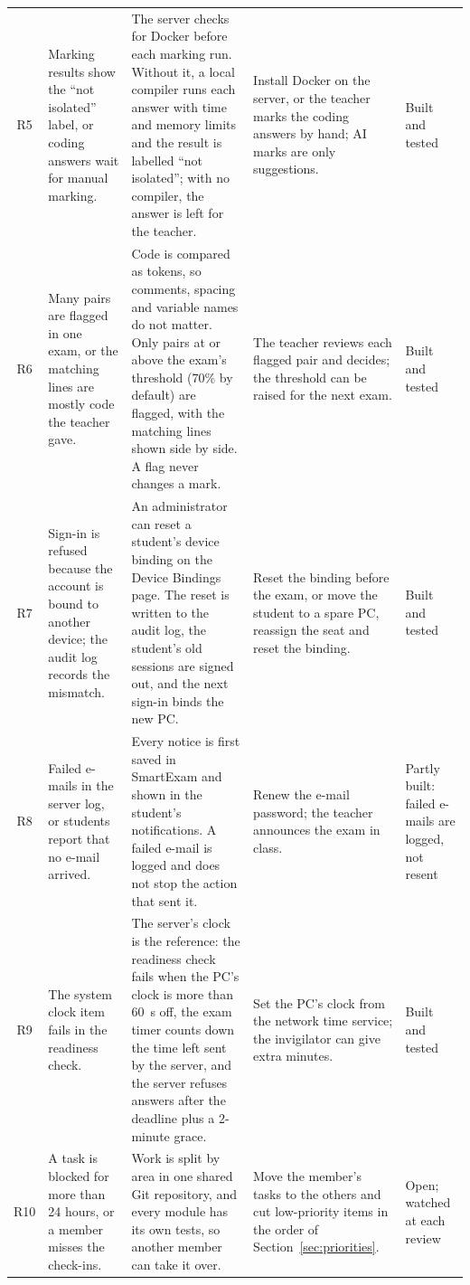 {\begin{longtable}{@{}c>{\raggedright\arraybackslash}p{2.9cm}>{\raggedright\arraybackslash}p{5.2cm}>{\raggedright\arraybackslash}p{3.9cm}>{\raggedright\arraybackslash}p{1.8cm}@{}}
R5 & Marking results show the ``not isolated'' label, or coding answers wait for manual marking. & The server checks for Docker before each marking run. Without it, a local compiler runs each answer with time and memory limits and the result is labelled ``not isolated''; with no compiler, the answer is left for the teacher. & Install Docker on the server, or the teacher marks the coding answers by hand; AI marks are only suggestions. & Built and tested \\
R6 & Many pairs are flagged in one exam, or the matching lines are mostly code the teacher gave. & Code is compared as tokens, so comments, spacing and variable names do not matter. Only pairs at or above the exam's threshold (70\% by default) are flagged, with the matching lines shown side by side. A flag never changes a mark. & The teacher reviews each flagged pair and decides; the threshold can be raised for the next exam. & Built and tested \\
R7 & Sign-in is refused because the account is bound to another device; the audit log records the mismatch. & An administrator can reset a student's device binding on the Device Bindings page. The reset is written to the audit log, the student's old sessions are signed out, and the next sign-in binds the new PC. & Reset the binding before the exam, or move the student to a spare PC, reassign the seat and reset the binding. & Built and tested \\
R8 & Failed e-mails in the server log, or students report that no e-mail arrived. & Every notice is first saved in SmartExam and shown in the student's notifications. A failed e-mail is logged and does not stop the action that sent it. & Renew the e-mail password; the teacher announces the exam in class. & Partly built: failed e-mails are logged, not resent \\
R9 & The system clock item fails in the readiness check. & The server's clock is the reference: the readiness check fails when the PC's clock is more than 60~s off, the exam timer counts down the time left sent by the server, and the server refuses answers after the deadline plus a 2-minute grace. & Set the PC's clock from the network time service; the invigilator can give extra minutes. & Built and tested \\
R10 & A task is blocked for more than 24 hours, or a member misses the check-ins. & Work is split by area in one shared Git repository, and every module has its own tests, so another member can take it over. & Move the member's tasks to the others and cut low-priority items in the order of Section~\ref{sec:priorities}. & Open; watched at each review \\

\end{longtable}}

